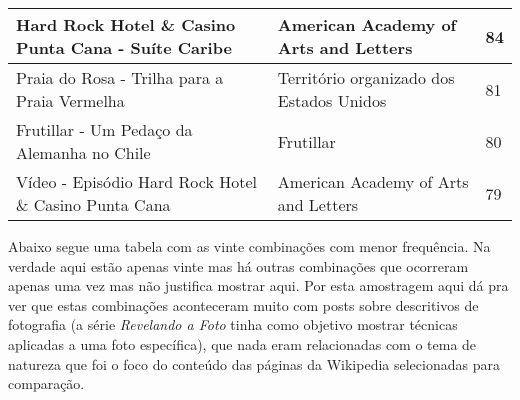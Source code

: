 \begin{center}
\begin{tabular}{ | m{15em} | m{15em} | m{8em} |}
        \hline
        Hard Rock Hotel \& Casino Punta Cana - Suíte Caribe & American Academy of Arts and Letters & 84 \\
        \hline
        Praia do Rosa - Trilha para a Praia Vermelha & Território organizado dos Estados Unidos & 81 \\
        \hline
        Frutillar - Um Pedaço da Alemanha no Chile & Frutillar & 80 \\
        \hline
        Vídeo - Episódio Hard Rock Hotel \& Casino Punta Cana & American Academy of Arts and Letters & 79 \\
        \hline
    \end{tabular}
\end{center}

Abaixo segue uma tabela com as vinte combinações com menor frequência. Na verdade aqui estão apenas vinte mas há outras combinações que ocorreram
apenas uma vez mas não justifica mostrar aqui. Por esta amostragem aqui dá pra ver que estas combinações aconteceram muito com posts sobre descritivos 
de fotografia (a série \textit{Revelando a Foto} tinha como objetivo mostrar técnicas aplicadas a uma foto específica), que nada eram relacionadas com 
o tema de natureza que foi o foco do conteúdo das páginas da Wikipedia selecionadas para comparação.

